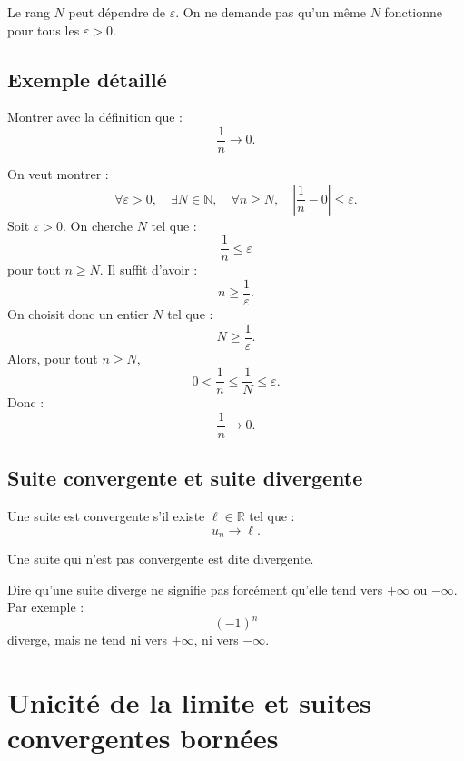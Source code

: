 \documentclass[11pt,a4paper]{article}
\newcommand{\N}{\mathbb N}
\newcommand{\R}{\mathbb R}
\begin{document}
\begin{erreurbox}
Le rang \(N\) peut dépendre de \(\varepsilon\).  
On ne demande pas qu'un même \(N\) fonctionne pour tous les \(\varepsilon>0\).
\end{erreurbox}

\subsection{Exemple détaillé}

\begin{exercicebox}
Montrer avec la définition que :
\[
\frac1n\longrightarrow0.
\]
\end{exercicebox}

\begin{correctionbox}
On veut montrer :
\[
\forall \varepsilon>0,\quad \exists N\in\N,\quad \forall n\geq N,\quad \left|\frac1n-0\right|\leq\varepsilon.
\]
Soit \(\varepsilon>0\).  
On cherche \(N\) tel que :
\[
\frac1n\leq\varepsilon
\]
pour tout \(n\geq N\).  
Il suffit d'avoir :
\[
n\geq \frac1\varepsilon.
\]
On choisit donc un entier \(N\) tel que :
\[
N\geq \frac1\varepsilon.
\]
Alors, pour tout \(n\geq N\),
\[
0<\frac1n\leq\frac1N\leq\varepsilon.
\]
Donc :
\[
\frac1n\to0.
\]
\end{correctionbox}

\subsection{Suite convergente et suite divergente}

\begin{definitionbox}
Une suite est convergente s'il existe \(\ell\in\R\) tel que :
\[
u_n\to\ell.
\]
\end{definitionbox}

\begin{definitionbox}
Une suite qui n'est pas convergente est dite divergente.
\end{definitionbox}

\begin{erreurbox}
Dire qu'une suite diverge ne signifie pas forcément qu'elle tend vers \(+\infty\) ou \(-\infty\).  
Par exemple :
\[
(-1)^n
\]
diverge, mais ne tend ni vers \(+\infty\), ni vers \(-\infty\).
\end{erreurbox}

\section{Unicité de la limite et suites convergentes bornées}
\end{document}
